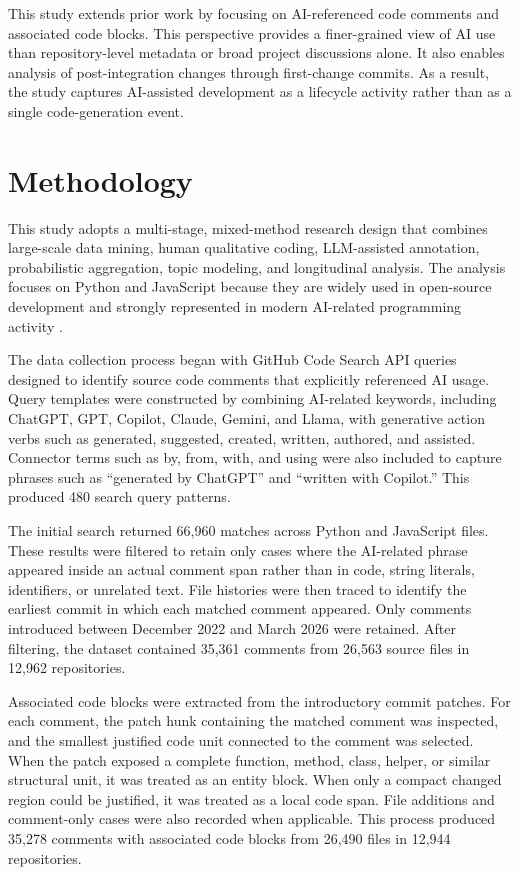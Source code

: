 \documentclass[12pt,draftclsnofoot,onecolumn]{IEEEtran}
\begin{document}
This study extends prior work by focusing on AI-referenced code comments and associated code blocks. This perspective provides a finer-grained view of AI use than repository-level metadata or broad project discussions alone. It also enables analysis of post-integration changes through first-change commits. As a result, the study captures AI-assisted development as a lifecycle activity rather than as a single code-generation event.

\section{Methodology}

This study adopts a multi-stage, mixed-method research design that combines large-scale data mining, human qualitative coding, LLM-assisted annotation, probabilistic aggregation, topic modeling, and longitudinal analysis. The analysis focuses on Python and JavaScript because they are widely used in open-source development and strongly represented in modern AI-related programming activity \cite{so2024tech}.

The data collection process began with GitHub Code Search API queries designed to identify source code comments that explicitly referenced AI usage. Query templates were constructed by combining AI-related keywords, including ChatGPT, GPT, Copilot, Claude, Gemini, and Llama, with generative action verbs such as generated, suggested, created, written, authored, and assisted. Connector terms such as by, from, with, and using were also included to capture phrases such as ``generated by ChatGPT'' and ``written with Copilot.'' This produced 480 search query patterns.

The initial search returned 66,960 matches across Python and JavaScript files. These results were filtered to retain only cases where the AI-related phrase appeared inside an actual comment span rather than in code, string literals, identifiers, or unrelated text. File histories were then traced to identify the earliest commit in which each matched comment appeared. Only comments introduced between December 2022 and March 2026 were retained. After filtering, the dataset contained 35,361 comments from 26,563 source files in 12,962 repositories.

Associated code blocks were extracted from the introductory commit patches. For each comment, the patch hunk containing the matched comment was inspected, and the smallest justified code unit connected to the comment was selected. When the patch exposed a complete function, method, class, helper, or similar structural unit, it was treated as an entity block. When only a compact changed region could be justified, it was treated as a local code span. File additions and comment-only cases were also recorded when applicable. This process produced 35,278 comments with associated code blocks from 26,490 files in 12,944 repositories.
\end{document}
